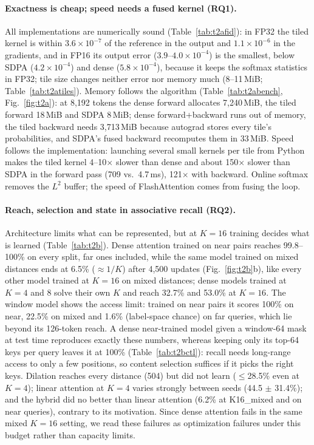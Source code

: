 \documentclass{article}
\begin{document}
\paragraph{Exactness is cheap; speed needs a fused kernel (RQ1).}
All implementations are numerically sound (Table~\ref{tab:t2afid}): in FP32 the tiled kernel is within $3.6\times10^{-7}$
of the reference in the output and $1.1\times10^{-6}$ in the gradients, and in FP16 its output error
($3.9$--$4.0\times10^{-4}$) is the smallest, below SDPA ($4.2\times10^{-4}$) and dense ($5.8\times10^{-4}$), because it keeps
the softmax statistics in FP32; tile size changes neither error nor memory much (8--11\,MiB; Table~\ref{tab:t2atiles}).
Memory follows the algorithm (Table~\ref{tab:t2abench}, Fig.~\ref{fig:t2a}): at 8,192 tokens the dense forward allocates
7,240\,MiB, the tiled forward 18\,MiB and SDPA 8\,MiB; dense forward+backward runs out of memory, the tiled backward needs
3,713\,MiB because autograd stores every tile's probabilities, and SDPA's fused backward recomputes them in 33\,MiB. Speed
follows the implementation: launching several small kernels per tile from Python makes the tiled kernel 4--10$\times$ slower
than dense and about 150$\times$ slower than SDPA in the forward pass (709 vs.\ 4.7\,ms), 121$\times$ with backward. Online
softmax removes the $L^2$ buffer; the speed of FlashAttention comes from fusing the loop.

\paragraph{Reach, selection and state in associative recall (RQ2).}
Architecture limits what can be represented, but at $K=16$ training decides what is learned (Table~\ref{tab:t2b}). Dense
attention trained on near pairs reaches 99.8--100\% on every split, far ones included, while the same model trained on
mixed distances ends at 6.5\% ($\approx1/K$) after 4,500 updates (Fig.~\ref{fig:t2b}b), like every other model trained at
$K=16$ on mixed distances; dense models trained at $K=4$ and 8 solve their own $K$ and reach 32.7\% and 53.0\% at $K=16$.
The window model shows the access limit: trained on near pairs it scores 100\% on near, 22.5\% on mixed and 1.6\%
(label-space chance) on far queries, which lie beyond its 126-token reach. A dense near-trained model given a window-64
mask at test time reproduces exactly these numbers, whereas keeping only its top-64 keys per query leaves it at 100\%
(Table~\ref{tab:t2bctl}): recall needs long-range access to only a few positions, so content selection suffices if it picks
the right keys. Dilation reaches every distance (504) but did not learn ($\le$28.5\% even at $K=4$); linear attention at
$K=4$ varies strongly between seeds (44.5 $\pm$ 31.4\%); and the hybrid did no better than linear attention (6.2\% at
K16\_mixed and on near queries), contrary to its motivation. Since dense attention fails in the same mixed $K=16$ setting,
we read these failures as optimization failures under this budget rather than capacity limits.
\end{document}
